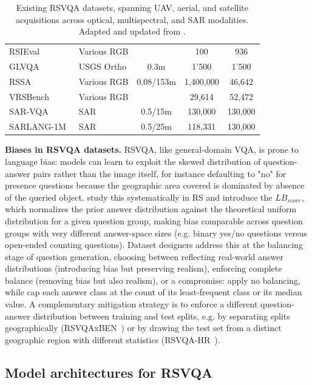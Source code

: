 \begin{table}[h]
\begin{tabularx}{\textwidth}{l X c c c}
RSIEval~\cite{hu2023rsgpt} & Various RGB & & 100 & 936 \\
GLVQA~\cite{guo2022glvqa} & USGS Ortho & 0.3m & 1'500 & 1'500  \\
RSSA~\cite{pang2024h2rsvlm} & Various RGB & 0.08/153m & 1,400,000 & 46,642 \\
VRSBench~\cite{li2024vrsbench} & Various RGB & & 29,614 & 52,472 \\
SAR-VQA~\cite{cheng2025sartext} & SAR & 0.5/15m & 130,000 & 130,000 \\
SARLANG-1M~\cite{wei2025sarlang} & SAR & 0.5/25m & 118,331 & 130,000 \\
\hline
\end{tabularx}
\caption{Existing RSVQA datasets, spanning UAV, aerial, and satellite acquisitions across optical, multispectral, and SAR modalities. Adapted and updated from \cite{boussaidtosato2025tour}.}
\label{tab:rw-vqa-datasets}
\end{table}

\textbf{Biases in RSVQA datasets.} RSVQA, like general-domain VQA, is prone to language bias: models can learn to exploit the skewed distribution of question-answer pairs rather than the image itself, for instance defaulting to "no" for presence questions because the geographic area covered is dominated by absence of the queried object. \textcite{chappuis2025langbias} study this systematically in RS and introduce the $LB_{score}$, which normalizes the prior answer distribution against the theoretical uniform distribution for a given question group, making bias comparable across question groups with very different answer-space sizes (e.g. binary yes/no questions versus open-ended counting questions). Dataset designers address this at the balancing stage of question generation, choosing between reflecting real-world answer distributions (introducing bias but preserving realism), enforcing complete balance (removing bias but also realism), or a compromise: \textcite{lobry2021rsvqaben} apply no balancing, while \textcite{tosato2025checkmate} cap each answer class at the count of its least-frequent class or its median value. A complementary mitigation strategy is to enforce a different question-answer distribution between training and test splits, e.g. by separating splits geographically (RSVQAxBEN~\cite{lobry2021rsvqaben}) or by drawing the test set from a distinct geographic region with different statistics (RSVQA-HR~\cite{lobry2020rsvqa}).

\subsection{Model architectures for RSVQA}
\label{sec:rw-vqa-methods}

